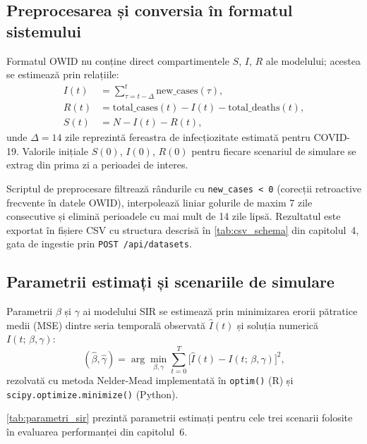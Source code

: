 \subsection{Preprocesarea și conversia în formatul sistemului}
\label{subsec:preprocesare}

Formatul OWID nu conține direct compartimentele $S$, $I$, $R$ ale modelului;
acestea se estimează prin relațiile:
\begin{align}
I(t) &= \sum_{\tau=t-\Delta}^{t} \text{new\_cases}(\tau), \label{eq:I_approx}\\
R(t) &= \text{total\_cases}(t) - I(t) - \text{total\_deaths}(t), \label{eq:R_approx}\\
S(t) &= N - I(t) - R(t), \label{eq:S_approx}
\end{align}
unde $\Delta = 14$ zile reprezintă fereastra de infecțiozitate estimată pentru
COVID-19. Valorile inițiale $S(0)$, $I(0)$, $R(0)$ pentru fiecare scenariul
de simulare se extrag din prima zi a perioadei de interes.

Scriptul de preprocesare filtrează rândurile cu \texttt{new\_cases < 0}
(corecții retroactive frecvente în datele OWID), interpolează liniar golurile
de maxim 7 zile consecutive și elimină perioadele cu mai mult de 14 zile
lipsă. Rezultatul este exportat în fișiere CSV cu structura descrisă în
\cref{tab:csv_schema} din capitolul~4, gata de ingestie prin
\texttt{POST /api/datasets}.

\subsection{Parametrii estimați și scenariile de simulare}
\label{subsec:parametri_estimati}

Parametrii $\beta$ și $\gamma$ ai modelului SIR se estimează prin minimizarea
erorii pătratice medii (MSE) dintre seria temporală observată
$\hat{I}(t)$ și soluția numerică $I(t;\,\beta,\gamma)$:
\begin{equation}
(\hat{\beta}, \hat{\gamma}) = \arg\min_{\beta,\gamma}
\sum_{t=0}^{T} \bigl[\hat{I}(t) - I(t;\,\beta,\gamma)\bigr]^2,
\label{eq:lsq_fit}
\end{equation}
rezolvată cu metoda Nelder-Mead \cite{nelder1965simplex} implementată în
\texttt{optim()} (R) și \texttt{scipy.optimize.minimize()} (Python).

\cref{tab:parametri_sir} prezintă parametrii estimați pentru cele trei
scenarii folosite în evaluarea performanței din capitolul~6.

